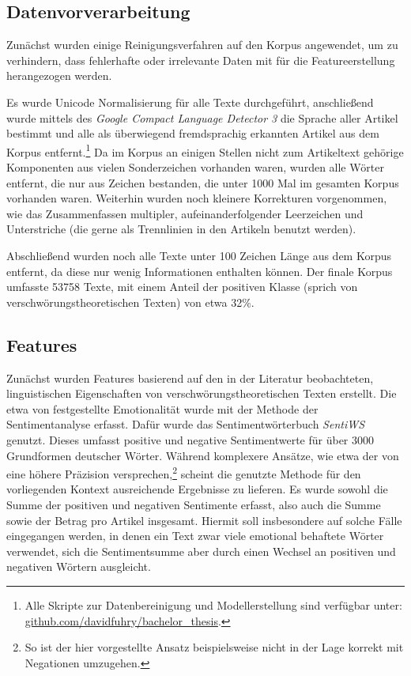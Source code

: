 \subsection{Datenvorverarbeitung}

Zunächst wurden einige Reinigungsverfahren auf den Korpus angewendet, um zu verhindern, dass fehlerhafte oder irrelevante Daten mit für die Featureerstellung herangezogen werden.

Es wurde Unicode Normalisierung für alle Texte durchgeführt, anschließend wurde mittels des \textit{Google Compact Language Detector 3} \parencite[][]{cld3} die Sprache aller Artikel bestimmt und alle als überwiegend fremdsprachig erkannten Artikel aus dem Korpus entfernt.\footnote{Alle Skripte zur Datenbereinigung und Modellerstellung sind verfügbar unter: \\ \href{https://github.com/davidfuhry/bachelor_thesis}{github.com/davidfuhry/bachelor\_thesis}.}
Da im Korpus an einigen Stellen nicht zum Artikeltext gehörige Komponenten aus vielen Sonderzeichen vorhanden waren, wurden alle Wörter entfernt, die nur aus Zeichen bestanden, die unter 1000 Mal im gesamten Korpus vorhanden waren.
Weiterhin wurden noch kleinere Korrekturen vorgenommen, wie das Zusammenfassen multipler, aufeinanderfolgender Leerzeichen und Unterstriche (die gerne als Trennlinien in den Artikeln benutzt werden).

Abschließend wurden noch alle Texte unter 100 Zeichen Länge aus dem Korpus entfernt, da diese nur wenig Informationen enthalten können. Der finale Korpus umfasste 53758 Texte, mit einem Anteil der positiven Klasse (sprich von verschwörungstheoretischen Texten) von etwa 32\%.

\subsection{Features}

Zunächst wurden Features basierend auf den in der Literatur beobachteten, linguistischen Eigenschaften von verschwörungstheoretischen Texten erstellt.
Die etwa von \textcite*[10]{miller_2002} festgestellte Emotionalität wurde mit der Methode der Sentimentanalyse erfasst.
Dafür wurde das Sentimentwörterbuch \textit{SentiWS} \parencite[][]{sentiws} genutzt.
Dieses umfasst positive und negative Sentimentwerte für über 3000 Grundformen deutscher Wörter.
Während komplexere Ansätze, wie etwa der von \textcite[]{ml_sentiment} eine höhere Präzision versprechen,\footnote{So ist der hier vorgestellte Ansatz beispielsweise nicht in der Lage korrekt mit Negationen umzugehen.} scheint die genutzte Methode für den vorliegenden Kontext ausreichende Ergebnisse zu lieferen.
Es wurde sowohl die Summe der positiven und negativen Sentimente erfasst, also auch die Summe sowie der Betrag pro Artikel insgesamt.
Hiermit soll insbesondere auf solche Fälle eingegangen werden, in denen ein Text zwar viele emotional behaftete Wörter verwendet, sich die Sentimentsumme aber durch einen Wechsel an positiven und negativen Wörtern ausgleicht.

